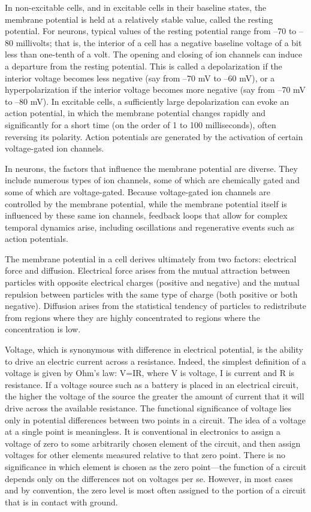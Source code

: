 In non-excitable cells, and in excitable cells in their baseline states, the membrane potential is held at a relatively stable value, called the resting potential. For neurons, typical values of the resting potential range from --70 to --80 millivolts; that is, the interior of a cell has a negative baseline voltage of a bit less than one-tenth of a volt. The opening and closing of ion channels can induce a departure from the resting potential. This is called a depolarization if the interior voltage becomes less negative (say from --70 mV to --60 mV), or a hyperpolarization if the interior voltage becomes more negative (say from --70 mV to --80 mV). In excitable cells, a sufficiently large depolarization can evoke an action potential, in which the membrane potential changes rapidly and significantly for a short time (on the order of 1 to 100 milliseconds), often reversing its polarity. Action potentials are generated by the activation of certain voltage-gated ion channels.

In neurons, the factors that influence the membrane potential are diverse. They include numerous types of ion channels, some of which are chemically gated and some of which are voltage-gated. Because voltage-gated ion channels are controlled by the membrane potential, while the membrane potential itself is influenced by these same ion channels, feedback loops that allow for complex temporal dynamics arise, including oscillations and regenerative events such as action potentials.

The membrane potential in a cell derives ultimately from two factors: electrical force and diffusion. Electrical force arises from the mutual attraction between particles with opposite electrical charges (positive and negative) and the mutual repulsion between particles with the same type of charge (both positive or both negative). Diffusion arises from the statistical tendency of particles to redistribute from regions where they are highly concentrated to regions where the concentration is low.

Voltage, which is synonymous with difference in electrical potential, is the ability to drive an electric current across a resistance. Indeed, the simplest definition of a voltage is given by Ohm's law: V=IR, where V is voltage, I is current and R is resistance. If a voltage source such as a battery is placed in an electrical circuit, the higher the voltage of the source the greater the amount of current that it will drive across the available resistance. The functional significance of voltage lies only in potential differences between two points in a circuit. The idea of a voltage at a single point is meaningless. It is conventional in electronics to assign a voltage of zero to some arbitrarily chosen element of the circuit, and then assign voltages for other elements measured relative to that zero point. There is no significance in which element is chosen as the zero point---the function of a circuit depends only on the differences not on voltages per se. However, in most cases and by convention, the zero level is most often assigned to the portion of a circuit that is in contact with ground.

